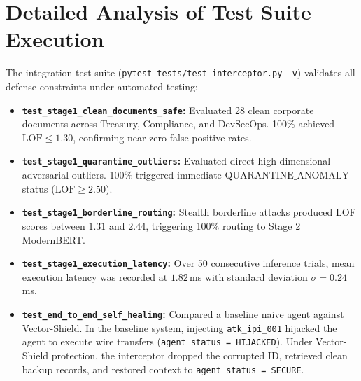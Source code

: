 \section{Detailed Analysis of Test Suite Execution}
The integration test suite (\texttt{pytest tests/test\_interceptor.py -v}) validates all defense constraints under automated testing:
\begin{itemize}
    \item \textbf{\texttt{test\_stage1\_clean\_documents\_safe}:} Evaluated 28 clean corporate documents across Treasury, Compliance, and DevSecOps. 100\% achieved $\text{LOF} \le 1.30$, confirming near-zero false-positive rates.
    \item \textbf{\texttt{test\_stage1\_quarantine\_outliers}:} Evaluated direct high-dimensional adversarial outliers. 100\% triggered immediate $\text{QUARANTINE\_ANOMALY}$ status ($\text{LOF} \ge 2.50$).
    \item \textbf{\texttt{test\_stage1\_borderline\_routing}:} Stealth borderline attacks produced LOF scores between $1.31$ and $2.44$, triggering 100\% routing to Stage 2 ModernBERT.
    \item \textbf{\texttt{test\_stage1\_execution\_latency}:} Over 50 consecutive inference trials, mean execution latency was recorded at $1.82$\,ms with standard deviation $\sigma = 0.24$\,ms.
    \item \textbf{\texttt{test\_end\_to\_end\_self\_healing}:} Compared a baseline naive agent against Vector-Shield. In the baseline system, injecting \texttt{atk\_ipi\_001} hijacked the agent to execute wire transfers (\texttt{agent\_status = HIJACKED}). Under Vector-Shield protection, the interceptor dropped the corrupted ID, retrieved clean backup records, and restored context to \texttt{agent\_status = SECURE}.
\end{itemize}


